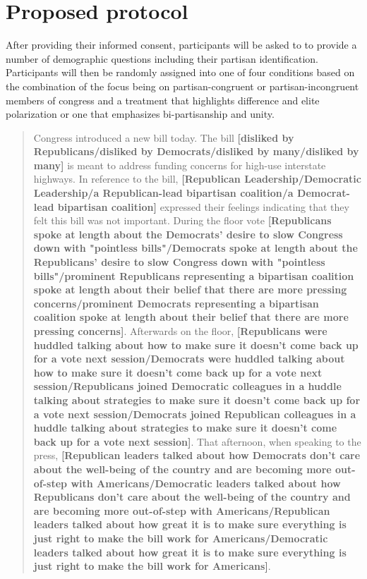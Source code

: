 \documentclass[12pt]{article}
\begin{document}
\section{Proposed protocol}

After providing their informed consent, participants will be asked to to provide a number of demographic questions including their partisan identification. Participants will then be randomly assigned into one of four conditions based on the combination of the focus being on partisan-congruent or partisan-incongruent members of congress and a treatment that highlights difference and elite polarization or one that emphasizes bi-partisanship and unity. 

\begin{quote}
	Congress introduced a new bill today. The bill \textbf{[disliked by Republicans/disliked by Democrats/disliked by many/disliked by many]} is meant to address funding concerns for high-use interstate highways. In reference to the bill, \textbf{[Republican Leadership/Democratic Leadership/a Republican-lead bipartisan coalition/a Democrat-lead bipartisan coalition]} expressed their feelings indicating that they felt this bill was not important. During the floor vote \textbf{[Republicans spoke at length about the Democrats' desire to slow Congress down with "pointless bills"/Democrats spoke at length about the Republicans' desire to slow Congress down with "pointless bills"/prominent Republicans representing a bipartisan coalition spoke at length about their belief that there are more pressing concerns/prominent Democrats representing a bipartisan coalition spoke at length about their belief that there are more pressing concerns]}. Afterwards on the floor, \textbf{[Republicans were huddled talking about how to make sure it doesn't come back up for a vote next session/Democrats were huddled talking about how to make sure it doesn't come back up for a vote next session/Republicans joined Democratic colleagues in a huddle talking about strategies to make sure it doesn't come back up for a vote next session/Democrats joined Republican colleagues in a huddle talking about strategies to make sure it doesn't come back up for a vote next session]}. That afternoon, when speaking to the press, \textbf{[Republican leaders talked about how Democrats don't care about the well-being of the country and are becoming more out-of-step with Americans/Democratic leaders talked about how Republicans don't care about the well-being of the country and are becoming more out-of-step with Americans/Republican leaders talked about how great it is to make sure everything is just right to make the bill work for Americans/Democratic leaders talked about how great it is to make sure everything is just right to make the bill work for Americans]}.
\end{quote}
\end{document}
